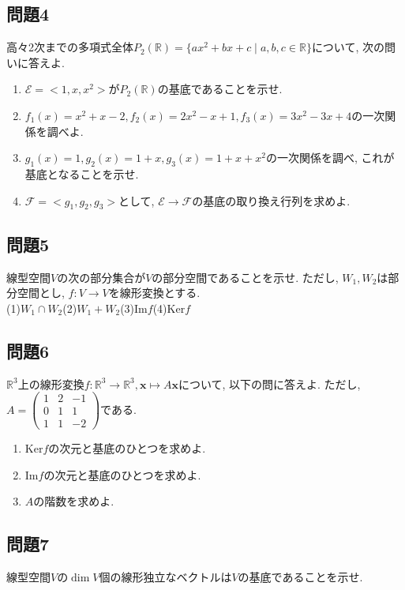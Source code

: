 \documentclass[a4j,dvipdfmx]{jsarticle}
\begin{document}
    \subsection*{問題4}
        高々2次までの多項式全体$P_2(\mathbb{R})=\{ax^2+bx+c\mid a,b,c\in \mathbb{R}\}$について, 次の問いに答えよ.
        \begin{enumerate}
            \item $\mathcal{E}=<1,x,x^2>$が$P_2(\mathbb{R})$の基底であることを示せ.
            \item $f_1(x)=x^2+x-2,f_2(x)=2x^2-x+1,f_3(x)=3x^2-3x+4$の一次関係を調べよ.
            \item $g_1(x)=1,g_2(x)=1+x,g_3(x)=1+x+x^2$の一次関係を調べ, これが基底となることを示せ.
            \item $\mathcal{F}=<g_1,g_2,g_3>$として, $\mathcal{E}\to\mathcal{F}$の基底の取り換え行列を求めよ.
        \end{enumerate}
    \subsection*{問題5}
        線型空間$V$の次の部分集合が$V$の部分空間であることを示せ. ただし, $W_1,W_2$は部分空間とし, $f:V\to V$を線形変換とする.\\
        (1)$W_1\cap W_2$\quad (2)$W_1+W_2$\quad (3)$\mathrm{Im}f$\quad (4)$\mathrm{Ker}f$
        
    \subsection*{問題6}
        \vspace*{-5mm}
        $\mathbb{R}^3$上の線形変換$f:\mathbb{R}^3\to\mathbb{R}^3,\bm{x}\mapsto A\bm{x}$について, 以下の問に答えよ. ただし, $A=\begin{pmatrix}1 & 2 & -1\\0 & 1 & 1\\ 1 & 1 & -2\end{pmatrix}$である.
        \vspace{-5mm}
        \begin{enumerate}
            \item $\mathrm{Ker}f$の次元と基底のひとつを求めよ.
            \item $\mathrm{Im} f$の次元と基底のひとつを求めよ.
            \item $A$の階数を求めよ.
        \end{enumerate}
    \subsection*{問題7}
        線型空間$V$の$\dim V$個の線形独立なベクトルは$V$の基底であることを示せ.
\end{document}
